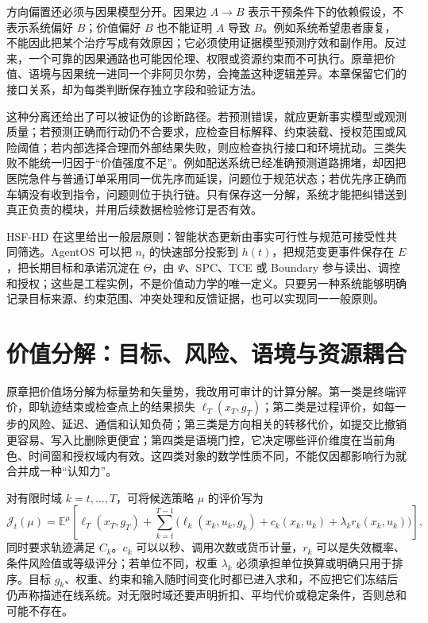 方向偏置还必须与因果模型分开。因果边 $A\to B$ 表示干预条件下的依赖假设，不表示系统偏好 $B$；价值偏好 $B$ 也不能证明 $A$ 导致 $B$。例如系统希望患者康复，不能因此把某个治疗写成有效原因；它必须使用证据模型预测疗效和副作用。反过来，一个可靠的因果通路也可能因伦理、权限或资源约束而不可执行。原章把价值、语境与因果统一进同一个非阿贝尔势，会掩盖这种逻辑差异。本章保留它们的接口关系，却为每类判断保存独立字段和验证方法。

这种分离还给出了可以被证伪的诊断路径。若预测错误，就应更新事实模型或观测质量；若预测正确而行动仍不合要求，应检查目标解释、约束装载、授权范围或风险阈值；若内部选择合理而外部结果失败，则应检查执行接口和环境扰动。三类失败不能统一归因于“价值强度不足”。例如配送系统已经准确预测道路拥堵，却因把医院急件与普通订单采用同一优先序而延误，问题位于规范状态；若优先序正确而车辆没有收到指令，问题则位于执行链。只有保存这一分解，系统才能把纠错送到真正负责的模块，并用后续数据检验修订是否有效。

HSF-HD 在这里给出一般层原则：智能状态更新由事实可行性与规范可接受性共同筛选。AgentOS 可以把 $n_t$ 的快速部分投影到 $h(t)$，把规范变更事件保存在 $E$，把长期目标和承诺沉淀在 $\Theta$，由 $\Psi$、SPC、TCE 或 Boundary 参与读出、调控和授权；这些是工程实例，不是价值动力学的唯一定义。只要另一种系统能够明确记录目标来源、约束范围、冲突处理和反馈证据，也可以实现同一一般原则。

\section{价值分解：目标、风险、语境与资源耦合}
\label{sec:section_6772}

原章把价值场分解为标量势和矢量势，我改用可审计的计算分解。第一类是终端评价，即轨迹结束或检查点上的结果损失 $\ell_T(x_T,g_T)$；第二类是过程评价，如每一步的风险、延迟、通信和认知负荷；第三类是方向相关的转移代价，如提交比撤销更容易、写入比删除更便宜；第四类是语境门控，它决定哪些评价维度在当前角色、时间窗和授权域内有效。这四类对象的数学性质不同，不能仅因都影响行为就合并成一种“认知力”。

对有限时域 $k=t,\ldots,T$，可将候选策略 $\mu$ 的评价写为
\begin{equation}
    \mathcal J_t(\mu)
    =\mathbb E^\mu\!\left[
      \ell_T(x_T,g_T)+
      \sum_{k=t}^{T-1}
      \bigl(\ell_k(x_k,u_k,g_k)+c_k(x_k,u_k)+\lambda_k r_k(x_k,u_k)\bigr)
    \right],
\end{equation}
同时要求轨迹满足 $C_k$。$c_k$ 可以以秒、调用次数或货币计量，$r_k$ 可以是失效概率、条件风险值或等级评分；若单位不同，权重 $\lambda_k$ 必须承担单位换算或明确只用于排序。目标 $g_k$、权重、约束和输入随时间变化时都已进入求和，不应把它们冻结后仍声称描述在线系统。对无限时域还要声明折扣、平均代价或稳定条件，否则总和可能不存在。

